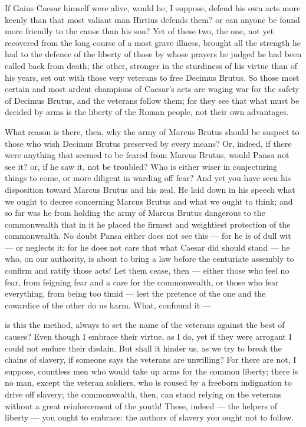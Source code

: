  If Gaius Caesar himself were alive, would he, I suppose, defend his own acts more keenly than that most valiant man Hirtius defends them? or can anyone be found more friendly to the cause than his son? Yet of these two, the one, not yet recovered from the long course of a most grave illness, brought all the strength he had to the defence of the liberty of those by whose prayers he judged he had been called back from death; the other, stronger in the sturdiness of his virtue than of his years, set out with those very veterans to free Decimus Brutus. So those most certain and most ardent champions of Caesar's acts are waging war for the safety of Decimus Brutus, and the veterans follow them; for they see that what must be decided by arms is the liberty of the Roman people, not their own advantages.

 What reason is there, then, why the army of Marcus Brutus should be suspect to those who wish Decimus Brutus preserved by every means? Or, indeed, if there were anything that seemed to be feared from Marcus Brutus, would Pansa not see it? or, if he saw it, not be troubled? Who is either wiser in conjecturing things to come, or more diligent in warding off fear? And yet you have seen his disposition toward Marcus Brutus and his zeal. He laid down in his speech what we ought to decree concerning Marcus Brutus and what we ought to think; and so far was he from holding the army of Marcus Brutus dangerous to the commonwealth that in it he placed the firmest and weightiest protection of the commonwealth. No doubt Pansa either does not see this --- for he is of dull wit --- or neglects it: for he does not care that what Caesar did should stand --- he who, on our authority, is about to bring a law before the centuriate assembly to confirm and ratify those acts! Let them cease, then --- either those who feel no fear, from feigning fear and a care for the commonwealth, or those who fear everything, from being too timid --- lest the pretence of the one and the cowardice of the other do us harm. What, confound it ---

 is this the method, always to set the name of the veterans against the best of causes? Even though I embrace their virtue, as I do, yet if they were arrogant I could not endure their disdain. But shall it hinder us, as we try to break the chains of slavery, if someone says the veterans are unwilling? For there are not, I suppose, countless men who would take up arms for the common liberty; there is no man, except the veteran soldiers, who is roused by a freeborn indignation to drive off slavery; the commonwealth, then, can stand relying on the veterans without a great reinforcement of the youth! These, indeed --- the helpers of liberty --- you ought to embrace: the authors of slavery you ought not to follow.


